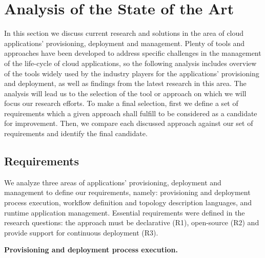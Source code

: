 
\chapter{Analysis of the State of the Art} %

\label{Chapter2} %



\noindent In this section we discuss current research and solutions in the area of cloud applications' provisioning, deployment and management. Plenty of tools and approaches have been developed to address specific challenges in the management of the life-cycle of cloud applications, so the following analysis includes overview of the tools widely used by the industry players for the applications' provisioning and deployment, as well as findings from the latest research in this area. The analysis will lead us to the selection of the tool or approach on which we will focus our research efforts. To make a final selection, first we define a set of requirements which a given approach shall fulfill to be considered as a candidate for improvement. Then, we compare each discussed approach against our set of requirements and identify the final candidate. 


\section{Requirements}

\noindent We analyze three areas of applications' provisioning, deployment and management to define our requirements, namely: provisioning and deployment process execution, workflow definition and topology description languages, and runtime application management. Essential requirements were defined in the research questions: the approach must be declarative (R1), open-source (R2) and provide support for continuous deployment (R3).

\noindent 

\noindent \textbf{Provisioning and deployment process execution.}

